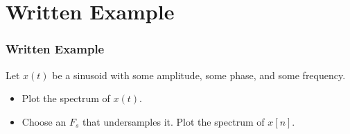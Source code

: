 \documentclass{beamer}
\begin{document}
\section[Example]{Written Example}
\setcounter{subsection}{1}

\begin{frame}
  \frametitle{Written Example}

  Let $x(t)$ be a sinusoid with some amplitude, some phase, and some frequency.
  \begin{itemize}
  \item Plot the spectrum of $x(t)$.
  \item Choose an $F_s$ that undersamples it.  Plot the spectrum of $x[n]$.
  \end{itemize}
\end{frame}
\end{document}

